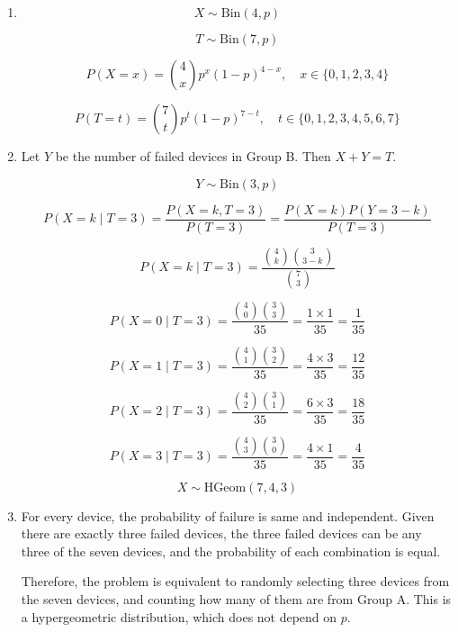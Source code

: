 \documentclass[a4paper]{article}
\begin{document}
\begin{enumerate}
    \item[(a)]
    
    $$
    X \sim \text{Bin}(4, p)
    $$

    $$
    T \sim \text{Bin}(7, p)
    $$

    $$
    P(X=x) = \binom{4}{x} p^x (1-p)^{4-x}, \quad x \in \{0,1,2,3,4\}
    $$

    $$
    P(T=t) = \binom{7}{t} p^t (1-p)^{7-t}, \quad t \in \{0,1,2,3,4,5,6,7\}
    $$

    \item[(b)]

    Let $Y$ be the number of failed devices in Group B. Then $X + Y = T$.

    $$
    Y \sim \text{Bin}(3, p)
    $$

    $$
    P(X = k  \mid  T = 3)
    = \frac{P(X = k, T = 3)}{P(T = 3)}
    = \frac{P(X = k) P(Y = 3 - k)}{P(T = 3)}
    $$

    $$
    P(X = k  \mid  T = 3) = \frac{\binom{4}{k} \binom{3}{3-k}}{\binom{7}{3}}
    $$

    $$
    P(X = 0  \mid  T = 3) = \frac{\binom{4}{0}\binom{3}{3}}{35} = \frac{1 \times 1}{35} = \frac{1}{35}
    $$

    $$
    P(X = 1  \mid  T = 3) = \frac{\binom{4}{1}\binom{3}{2}}{35} = \frac{4 \times 3}{35} = \frac{12}{35}
    $$

    $$
    P(X = 2  \mid  T = 3) = \frac{\binom{4}{2}\binom{3}{1}}{35} = \frac{6 \times 3}{35} = \frac{18}{35}
    $$

    $$
    P(X = 3  \mid  T = 3) = \frac{\binom{4}{3}\binom{3}{0}}{35} = \frac{4 \times 1}{35} = \frac{4}{35}
    $$

    $$
    X \sim \text{HGeom}(7, 4, 3)
    $$

    \item[(c)]
    
    For every device, the probability of failure is same and independent. Given there are exactly three 
    failed devices, the three failed devices can be any three of the seven devices, and the probability of each combination is equal.

    Therefore, the problem is equivalent to randomly selecting three devices from the seven devices, and counting how many of them are from Group A. This is a hypergeometric distribution, which does not depend on $p$.
\end{enumerate}

\newpage
\end{document}
